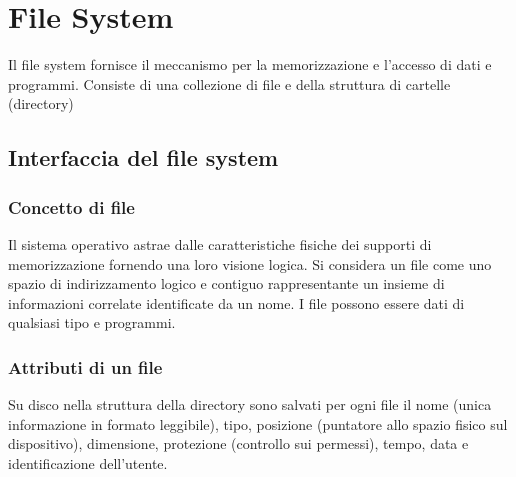 \chapter{File System}
Il file system fornisce il meccanismo per la memorizzazione e l'accesso di dati e programmi. Consiste di una collezione di file e della struttura di cartelle (directory)
\section{Interfaccia del file system}
\subsection{Concetto di file}
Il sistema operativo astrae dalle caratteristiche fisiche dei supporti di memorizzazione fornendo una loro visione logica. Si considera un file come uno spazio di indirizzamento logico 
e contiguo rappresentante un insieme di informazioni correlate identificate da un nome. I file possono essere dati di qualsiasi tipo e programmi. 
\subsection{Attributi di un file}
Su disco nella struttura della directory sono salvati per ogni file il nome (unica informazione in formato leggibile), tipo, posizione (puntatore allo spazio fisico sul dispositivo), 
dimensione, protezione (controllo sui permessi), tempo, data e identificazione dell'utente. 
